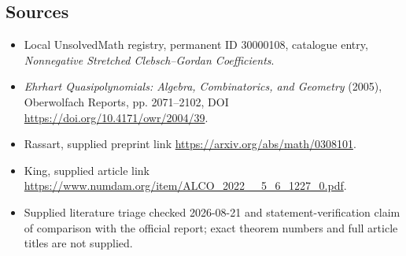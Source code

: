 \documentclass[11pt]{article}
\begin{document}
\subsection{Sources}
\begin{itemize}
\item Local UnsolvedMath registry, permanent ID 30000108, catalogue entry, \emph{Nonnegative Stretched Clebsch--Gordan Coefficients}.
\item \emph{Ehrhart Quasipolynomials: Algebra, Combinatorics, and Geometry} (2005), Oberwolfach Reports, pp. 2071--2102, DOI \url{https://doi.org/10.4171/owr/2004/39}.
\item Rassart, supplied preprint link \url{https://arxiv.org/abs/math/0308101}.
\item King, supplied article link \url{https://www.numdam.org/item/ALCO_2022__5_6_1227_0.pdf}.
\item Supplied literature triage checked 2026-08-21 and statement-verification claim of comparison with the official report; exact theorem numbers and full article titles are not supplied.
\end{itemize}
\end{document}
